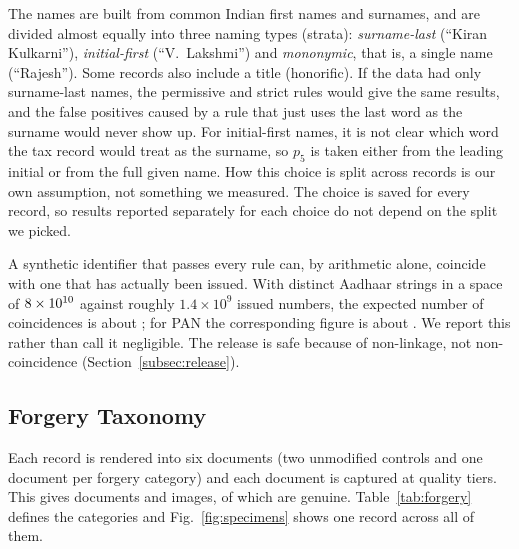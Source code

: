 \documentclass[VANCOUVER,Times1COL]{WileyNJDv5}
\begin{document}
The names are built from common Indian first names and surnames, and are divided almost equally into three naming types (strata): \emph{surname-last} (``Kiran Kulkarni''), \emph{initial-first} (``V.~Lakshmi'') and \emph{mononymic}, that is, a single name (``Rajesh''). Some records also include a title (honorific). If the data had only surname-last names, the permissive and strict rules would give the same results, and the false positives caused by a rule that just uses the last word as the surname would never show up. For initial-first names, it is not clear which word the tax record would treat as the surname, so $p_5$ is taken either from the leading initial or from the full given name. How this choice is split across records is our own assumption, not something we measured. The choice is saved for every record, so results reported separately for each choice do not depend on the split we picked.

A synthetic identifier that passes every rule can, by arithmetic alone,
coincide with one that has actually been issued. With \dsAadhaarStrings{}
distinct Aadhaar strings in a space of $8\times10^{10}$ against roughly
$1.4\times10^9$ issued numbers, the expected number of coincidences is
about \dsAadhaarCoinExp{}; for PAN the corresponding figure is about
\dsPanCoinExp{}. We report this rather than call it negligible. The
release is safe because of non-linkage, not non-coincidence
(Section~\ref{subsec:release}).

\subsection{Forgery Taxonomy}
\label{subsec:taxonomy}

Each record is rendered into six documents (two unmodified controls and
one document per forgery category) and each document is captured at
\dsNq{} quality tiers. This gives \dsDocuments{} documents and
\dsImages{} images, of which \dsGenuine{} are genuine.
Table~\ref{tab:forgery} defines the categories and
Fig.~\ref{fig:specimens} shows one record across all of them.
\end{document}
